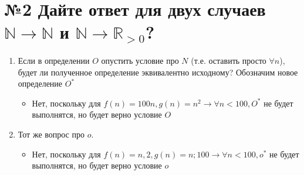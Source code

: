 
\section*{№2 Дайте ответ для двух случаев $\mathbb{N} \to \mathbb{N}$ и $\mathbb{N} \to \mathbb{R}_{>0}$?}
\begin{enumerate}
    \item
      Если в определении $O$ опустить условие про $N$ (т.е. оставить
      просто $\forall n$), будет ли полученное определение эквивалентно
      исходному? Обозначим новое определение $O^*$

      \begin{itemize}
        \item
         Нет,  поскольку для $f(n)=100n, g(n)=n^2 \rightarrow \forall n < 100, O^*$ не будет выполнятся, но будет верно условие $O$
       
      \end{itemize}
  
    \item
      Тот же вопрос про $o$.
      \begin{itemize}
        \item
         Нет,  поскольку для $f(n)=n,2, g(n)=n;100 \rightarrow \forall n < 100, o^*$ не будет выполнятся, но будет верно условие $o$
       
      \end{itemize}
  
  \end{enumerate}
